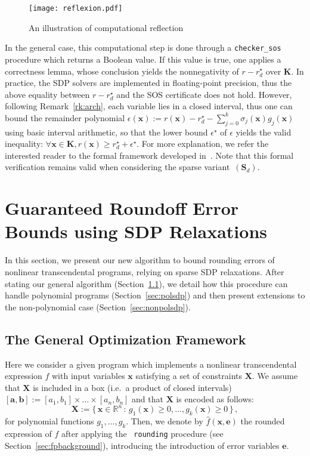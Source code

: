 \documentclass[preprint]{sigplanconf}
\newcommand{\code}[1]{\lstinline{#1}}
\newcommand{\R}{\mathbb{R}}
\newcommand{\x}{\mathbf{x}}
\newcommand{\e}{\mathbf{e}}
\renewcommand{\b}{\mathbf{b}}
\def\a{\mathbf{a}}
\def\S{\mathbf{S}}
\def\K{\mathbf{K}}
\def\S{\mathbf{S}}
\def\X{\mathbf{X}}
\theoremstyle{plain}
\begin{document}
\fi
%
\begin{figure}[!ht]
\centering
\texttt{[image: reflexion.pdf]}
\caption{An illustration of computational reflection}	
\label{fig:reflexion}
\end{figure}
%
In the general case, this computational step is done through a \code{checker_sos} procedure which returns a Boolean value. If this value is true, one applies a correctness lemma, whose conclusion yields the nonnegativity of $r - r_d^\star$ over $\K$.
In practice, the SDP solvers are implemented in floating-point precision, thus the above equality between $r - r_d^\star$ and the SOS certificate does not hold. However, following Remark~\ref{rk:arch}, each variable lies in a closed interval, thus one can bound the remainder polynomial $\epsilon(\x) := r(\x) - r_d^\star - \sum_{j=0}^k \sigma_j(\x) g_j(\x)$ using basic interval arithmetic, so that the lower bound $\epsilon^\star$ of $\epsilon$ yields the valid inequality: $\forall \x \in \K, r(\x) \geq r_d^\star + \epsilon^\star$.
For more explanation, we refer the interested reader to the formal framework developed in~\cite{jfr14}. Note that this formal verification remains valid when considering the sparse variant~$(\S_d)$.
%
\section{Guaranteed Roundoff Error Bounds using SDP Relaxations}
\label{sec:fpsdp}
In this section, we present our new algorithm to bound rounding errors of nonlinear transcendental programs, relying on sparse SDP relaxations. After stating our general algorithm (Section~\ref{sec:transcsdp}), we detail how this procedure can handle polynomial programs (Section~\ref{sec:polsdp}) and then present extensions to the non-polynomial case (Section~\ref{sec:nonpolsdp}).

\subsection{The General Optimization Framework}
\label{sec:transcsdp}
%
Here we consider a given program which implements a nonlinear transcendental expression $f$ with input variables $\x$ satisfying a set of constraints $\X$. We assume that  $\X$ is included in a box (i.e.~a product of closed intervals) $[\a, \b] := [a_1, b_1] \times \dots \times [a_n, b_n]$ and that $\X$ is encoded as follows: 
\[ 
\X := \{\, \x \in \R^n \, : \, g_1 (\x) \geq 0, \dots, g_{k} (\x) \geq 0 \,\} \,,
\]
for polynomial functions $g_1, \dots, g_k$. 
%
Then, we denote by $\hat{f}(\x,\e)$ the rounded expression of $f$ after applying the ~\lstinline|rounding| procedure (see Section~\ref{sec:fpbackground}), introducing the introduction of error variables $\e$. 
\end{document}
